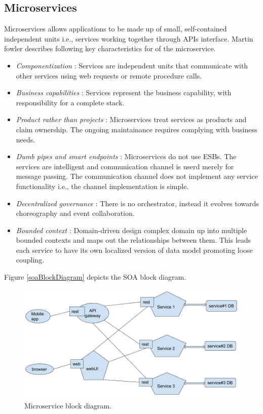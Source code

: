 \documentclass[conference]{IEEEtran}
\begin{document}
\subsection{Microservices}
Microservices \cite{microservice} allows applications to be made up of small, self-contained independent units i.e., services working together through APIs interface. Martin fowler \cite{microservice} describes following key characteristics for of the microservice.
\begin{itemize}
\item \textit{Componentization} : Services are independent units that communicate with other services using web requests or remote procedure calls.
\item \textit{Business capabilities} :  Services represent the business capability, with responsibility for a complete stack.
\item \textit{Product rather than projects} : Microservices treat services as products and claim ownership. The ongoing maintainance requires complying with business needs.
\item \textit{Dumb pipes and smart endpoints} : Microservices do not use ESBs. The services are intelligent and communication channel is userd merely for message passing. The communication channel does not implement any service functionality i.e., the channel implementation is simple.
\item \textit{Decentralized governance} : There is no orchestrator, instead it evolves towards choreography and event collaboration.
\item \textit{Bounded context} : Domain-driven design complex domain up into multiple bounded contexts and maps out the relationships between them. This leads each service to have its own localized version of data model promoting loose coupling.
\end{itemize}
Figure \ref{soaBlockDiagram} depicts the SOA block diagram.

\begin{figure}[htbp]
\centerline{\includegraphics[scale=0.25]{Microservice.png}}
\caption{Microservice block diagram.}
\label{Microservice}
\end{figure}
\end{document}
